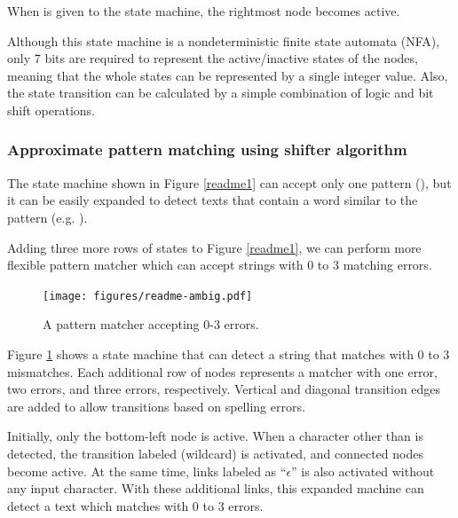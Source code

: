 \documentclass[manuscript,screen,review]{acmart}
\begin{document}
When  is given to the state machine,
the rightmost node becomes active.
%

Although this state machine is a nondeterministic finite state automata (NFA),
only 7 bits are required to represent the active/inactive states of the nodes,
meaning that the whole states can be represented by a single integer value.
Also,
the state transition can be calculated by a simple combination of
logic and bit shift operations.

\subsubsection{Approximate pattern matching using shifter algorithm}

The state machine shown in Figure \ref{readme1} can accept only one pattern
(), but
it can be easily expanded to detect texts that contain a word
similar to the pattern (e.g. ).


Adding three more rows of states to Figure \ref{readme1}, we can perform more
flexible pattern matcher which can accept strings with
0 to 3 matching errors.

\begin{figure}[htb]
  \centerline{\texttt{[image: figures/readme-ambig.pdf]}}
  \caption{A pattern matcher accepting 0-3 errors.}
  \label{shifterambig}
\end{figure}

Figure \ref{shifterambig} shows a state machine that can detect a string
that matches  with 0 to 3 mismatches.
Each additional row of nodes represents a matcher with one error,
two errors, and three errors, respectively.
Vertical and diagonal transition edges are added to allow
transitions based on spelling errors.

Initially, only the bottom-left node is active.
When a character other than  is detected, 
the transition labeled \sqsf{*} (wildcard) is activated,
and connected nodes become active.
At the same time, links labeled as ``$\epsilon$''
is also activated without any input character.
With these additional links, this expanded machine can detect a text which
matches  with 0 to 3 errors.
\end{document}
